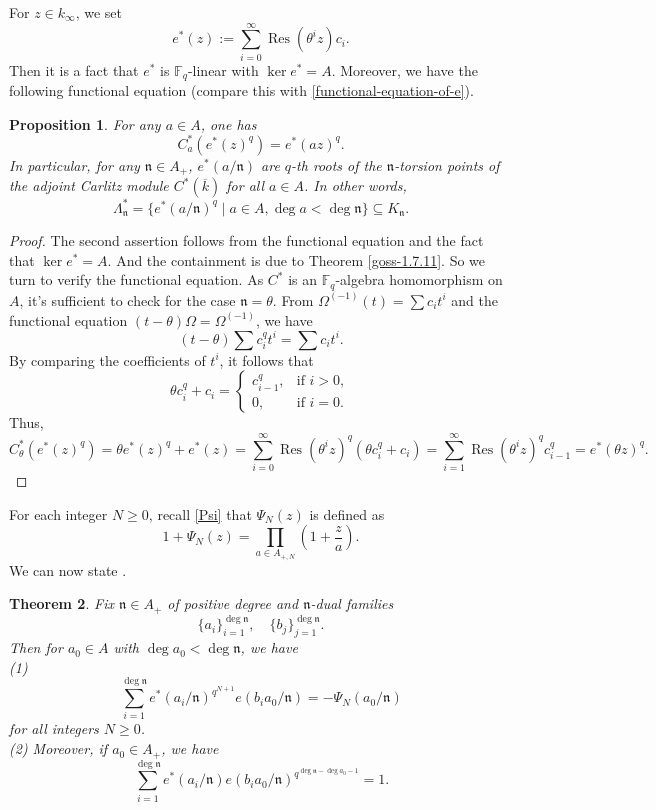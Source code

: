 \documentclass[11pt]{amsart}
\theoremstyle{plain}
\newtheorem{thm}{Theorem}[subsection]
\newtheorem{prop}[thm]{Proposition}
\theoremstyle{definition}
\theoremstyle{remark}
\numberwithin{equation}{section}
\newcommand{\FF}{\mathbb{F}}
\newcommand{\nfk}{\mathfrak{n}}
\newcommand{\Res}{\operatorname{Res}}
\newcommand{\ovl}{\overline}
\newcommand{\sbe}{\subseteq}
\newcommand{\Fq}{\FF_q}
\newcommand{\T}{\theta}
\begin{document}
	For $z \in k_\infty$, we set
	$$
	e^*(z) := \sum_{i=0}^\infty \Res(\T^iz)c_i.
	$$
	Then it is a fact that $e^*$ is $\Fq$-linear with $\ker e^* = A$.
	Moreover, we have the following functional equation (compare this with \eqref{functional-equation-of-e}).
	
	\begin{prop}
		For any $a \in A$, one has
		$$
		C_a^*(e^*(z)^q) = e^*(az)^q.
		$$
		In particular, for any $\nfk \in A_+$, $e^*(a/\nfk)$ are $q$-th roots of the $\nfk$-torsion points of the adjoint Carlitz module $C^*(\ovl{k})$ for all $a \in A$. In other words,
		$$
		\Lambda_\nfk^* = \{ e^*(a/\nfk)^q \mid a \in A, \deg a < \deg \nfk \} \sbe K_\nfk.
		$$
	\end{prop}
	
	\begin{proof}
		The second assertion follows from the functional equation and the fact that $\ker e^* = A$. 
		And the containment is due to Theorem \ref{goss-1.7.11}. 
		So we turn to verify the functional equation. 
		As $C^*$ is an $\Fq$-algebra homomorphism on $A$, it's sufficient to check for the case $\nfk = \T$.
		From $\Omega^{(-1)}(t) = \sum c_it^i$ and the functional equation $(t-\T)\Omega = \Omega^{(-1)}$, we have
		$$
		(t-\T) \sum c_i^q t^i = \sum c_i t^i.
		$$
		By comparing the coefficients of $t^i$, it follows that
		$$
		\T c_i^q + c_i = 
		\begin{cases}
			c_{i-1}^q, & \text{if } i>0, \\
			0, & \text{if } i=0.
		\end{cases}
		$$
		Thus,
		$$
		C_\T^*(e^*(z)^q)
		= \T e^*(z)^q +  e^*(z)
		= \sum_{i=0}^\infty \Res(\T^iz)^q (\T c_i^q+c_i)
		= \sum_{i=1}^\infty \Res(\T^iz)^q c_{i-1}^q
		=  e^*(\T z)^q.
		$$
	\end{proof}
	
	For each integer $N\geq 0$, recall \eqref{Psi} that $\Psi_N(z)$ is defined as
	$$
	1 + \Psi_N(z)
	= \prod_{a\in A_{+,N}} \left(1+\frac{z}{a}\right).
	$$
	We can now state \cite[Theorem 5.4.4]{abp2004determination}.
	
	\begin{thm}    \label{original-abp-5.4.4}
		Fix $\nfk \in A_+$ of positive degree and $\nfk$-dual families 
		$$
		\{a_i\}_{i=1}^{\deg\nfk},
		\quad
		\{b_j\}_{j=1}^{\deg\nfk}.
		$$
		Then for $a_0 \in A$ with $\deg a_0 < \deg \nfk$, we have    \\
		(1)
		$$
		\sum_{i=1}^{\deg \nfk} e^*(a_i/\nfk)^{q^{N+1}} e(b_ia_0/\nfk) = -\Psi_N(a_0/\nfk)
		$$
		for all integers $N\geq 0$.    \\
		(2) Moreover, if $a_0 \in A_+$, we have
		$$
		\sum_{i=1}^{\deg \nfk} e^*(a_i/\nfk) e(b_ia_0/\nfk)^{q^{\deg \nfk - \deg a_0 -1}} = 1.
		$$
	\end{thm}
	
\end{document}
